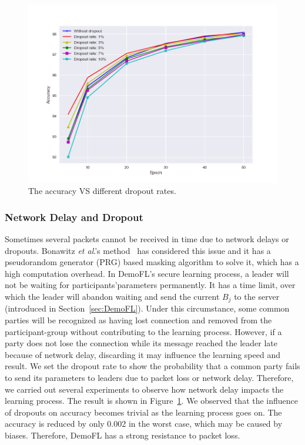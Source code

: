 \begin{figure}[!ht]
    \centering
    \includegraphics[width=\columnwidth]{img/dropout-acc.png}
    \caption{The accuracy VS different dropout rates.}
    \label{dropout-acc}
\end{figure}

\subsubsection{Network Delay and Dropout}
Sometimes several packets cannot be received in time due to network delays or dropouts. Bonawitz \emph{et al}.'s method~\cite{Practical} has considered this issue and it has a pseudorandom generator (PRG) based masking algorithm to solve it, which has a high computation overhead. In DemoFL's secure learning process, a leader will not be waiting for participants'parameters permanently. It has a time limit, over which the leader will abandon waiting and send the current $B_j$ to the server (introduced in Section~\ref{sec:DemoFL}). Under this circumstance, some common parties will be recognized as having lost connection and removed from the participant-group without contributing to the learning process. However, if a party does not lose the connection while its message reached the leader late because of network delay, discarding it may influence the learning speed and result. We set the dropout rate to show the probability that a common party fails to send its parameters to leaders due to packet loss or network delay. Therefore, we carried out several experiments to observe how network delay impacts the learning process. The result is shown in Figure~\ref{dropout-acc}. We observed that the influence of dropouts on accuracy becomes trivial as the learning process goes on. The accuracy is reduced by only 0.002 in the worst case, which may be caused by biases. Therefore, DemoFL has a strong resistance to packet loss. 